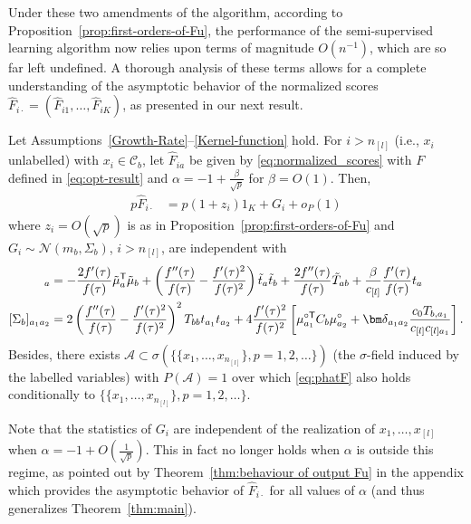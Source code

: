 \documentclass[twoside,11pt]{article}
\def\trans{{\sf T}}
\begin{document}
Under these two amendments of the algorithm, according to Proposition~\ref{prop:first-orders-of-Fu}, the performance of the semi-supervised learning algorithm now relies upon terms of magnitude $O(n^{-1})$, which are so far left undefined. A thorough analysis of these terms allows for a complete understanding of the asymptotic behavior of the normalized scores $\hat{F}_{i\cdot}=(\hat F_{i1},\ldots,\hat F_{iK})$, as presented in our next result. 
\begin{theorem}
	\label{thm:main}
	Let Assumptions~\ref{Growth-Rate}--\ref{Kernel-function} hold. For $i>n_{[l]}$ (i.e., $x_i$ unlabelled) with $x_i\in\mathcal C_b$, let $\hat F_{ia}$ be given by \eqref{eq:normalized_scores} with $F$ defined in \eqref{eq:opt-result} and $\alpha=-1+\frac{\beta}{\sqrt{p}}$ for $\beta=O(1)$. Then, 
	\begin{align}
		\label{eq:phatF}
	p\hat F_{i\cdot} &= p(1+z_i)1_K+ G_i + o_P(1)
	\end{align}
	where $z_i=O(\sqrt{p})$ is as in Proposition~\ref{prop:first-orders-of-Fu} and $G_i \sim \mathcal N( m_b , \Sigma_b )$, $i>n_{[l]}$, are independent with
	\begin{align}
	[m_b]_a &= -\frac{2f'(\tau)}{f(\tau)} \tilde\mu_a^\trans\tilde\mu_b+\left( \frac{f''(\tau)}{f(\tau)} - \frac{f'(\tau)^2}{f(\tau)^2} \right) \tilde t_a \tilde t_b + \frac{2f''(\tau)}{f(\tau)}\tilde T_{ab} + \frac{\beta}{c_{[l]}} \frac{f'(\tau)}{f(\tau)}t_a \label{eq:thm:main mean}\\
	[\Sigma_b]_{a_1a_2} &= 2\left( \frac{f''(\tau)}{f(\tau)} - \frac{f'(\tau)^2}{f(\tau)^2} \right)^2T_{bb} t_{a_1}t_{a_2} +4\frac{f'(\tau)^2}{f(\tau)^2} \left[ \mu_{a_1}^{\circ\trans}C_b\mu_{a_2}^\circ + {\bm\delta}_{a_1a_2} \frac{c_0 T_{b,a_1}}{c_{[l]}c_{[l]a_1}} \right]. \label{eq:thm:main covariance}
	\end{align}
	Besides, there exists $\mathcal A\subset \sigma(\{\{x_1,\ldots,x_{n_{[l]}}\},p=1,2,\ldots\})$ (the $\sigma$-field induced by the labelled variables) with $P(\mathcal A)=1$ over which \eqref{eq:phatF} also holds conditionally to $\{\{x_1,\ldots,x_{n_{[l]}}\},p=1,2,\ldots\}$.
\end{theorem}
Note that the statistics of $G_i$ are independent of the realization of $x_1,\ldots,x_{[l]}$ when $\alpha=-1+O(\frac{1}{\sqrt{p}})$. This in fact no longer holds when $\alpha$ is outside this regime, as pointed out by Theorem~\ref{thm:behaviour of output Fu} in the appendix which provides the asymptotic behavior of $\hat{F}_{i\cdot}$ for all values of $\alpha$ (and thus generalizes Theorem~\ref{thm:main}).
\end{document}
